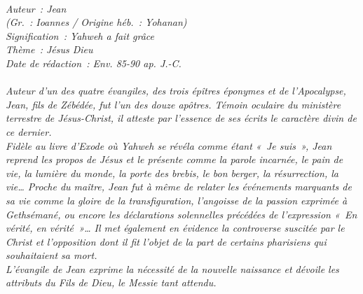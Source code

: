 \BFont
\noindent\hrulefill
{\footnotesize
\textit{
\bigskip
{\centering{}
\\Auteur~: Jean
\\(Gr.~: Ioannes / Origine héb.~: Yohanan)
\\Signification~: Yahweh a fait grâce
\\Thème~: Jésus Dieu
\\Date de rédaction~: Env. 85-90 ap. J.-C.\\}
}
\textit{
\\Auteur d'un des quatre évangiles, des trois épîtres éponymes et de l'Apocalypse, Jean, fils de Zébédée, fut l'un des douze apôtres. Témoin oculaire du ministère terrestre de Jésus-Christ, il atteste par l'essence de ses écrits le caractère divin de ce dernier.
\\Fidèle au livre d'Exode où Yahweh se révéla comme étant «~Je suis~», Jean reprend les propos de Jésus et le présente comme la parole incarnée, le pain de vie, la lumière du monde, la porte des brebis, le bon berger, la résurrection, la vie… Proche du maître, Jean fut à même de relater les événements marquants de sa vie comme la gloire de la transfiguration, l'angoisse de la passion exprimée à Gethsémané, ou encore les déclarations solennelles précédées de l'expression «~En vérité, en vérité~»… Il met également en évidence la controverse suscitée par le Christ et l'opposition dont il fit l'objet de la part de certains pharisiens qui souhaitaient sa mort.
\\L'évangile de Jean exprime la nécessité de la nouvelle naissance et dévoile les attributs du Fils de Dieu, le Messie tant attendu.\bigskip
}
}
\par\nobreak\noindent\hrulefill
